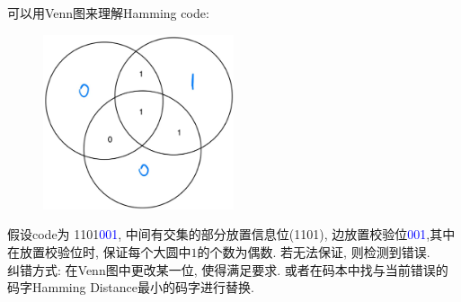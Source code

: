 可以用Venn图来理解Hamming code:
\begin{figure}[htbp]
    \centering
    \includegraphics[width=0.5\textwidth]{./figures/chapter5/parity_check_venn.png}
\end{figure}
假设code为 1101\textcolor{blue}{001}, 中间有交集的部分放置信息位(1101), 边放置校验位\textcolor{blue}{001},其中在放置校验位时, 保证每个大圆中$1$的个数为偶数. 若无法保证, 则检测到错误. \\
纠错方式: 在Venn图中更改某一位, 使得满足要求. 或者在码本中找与当前错误的码字Hamming Distance最小的码字进行替换.
